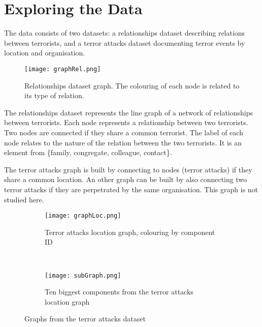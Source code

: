 \section{Exploring the Data}
\label{sec:Exploring the Data}

The data consists of two datasets: a relationships dataset describing relations between terrorists, and a terror attacks dataset documenting terror events by location and organisation.


\begin{figure}[H]
\begin{center}

        \texttt{[image: graphRel.png]}
        \label{fig:graphLoc}
        \caption{Relationships dataset graph. The colouring of each node is related to its type of relation.}
        
\end{center}
\end{figure}

The relationships dataset represents the line graph of a network of relationships between terrorists. Each node represents a relationship between two terrorists. Two nodes are connected if they share a common terrorist. %
The label of each node relates to the nature of the relation between the two terrorists. It is an element from \{family, congregate, colleague, contact\}.


The terror attacks graph is built by connecting to nodes (terror attacks) if they share a common location. An other graph can be built by also connecting two terror attacks if they are perpetrated by the same organisation. This graph is not studied here.

\begin{figure}[t]
\begin{center}
    \begin{subfigure}[b]{0.45\textwidth}
        \texttt{[image: graphLoc.png]}
        \caption{Terror attacks location graph, colouring by component ID}
        \label{fig:graphLoc}
    \end{subfigure}
    ~
    \begin{subfigure}[b]{0.45\textwidth}
        \texttt{[image: subGraph.png]}
        \caption{Ten biggest components from the terror attacks location graph}
        \label{fig:subGraph}
    \end{subfigure}
\caption{Graphs from the terror attacks dataset}
\label{fig:graphPlots}
\end{center}
\end{figure}

